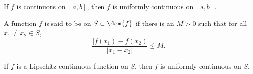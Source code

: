 \begin{theorem}
If $f$ is continuous on $[a,b]$, then $f$ is uniformly continuous on $[a,b]$. 
\end{theorem}

\begin{definition}
A function $f$ is said to be  on $S\subset \dom{f}$ if there is an $M>0$ such that for all $x_1 \neq x_2 \in S$, 
$$ \dfrac{|f(x_1)-f(x_2)}{|x_1-x_2|} \leq M.$$ 
\end{definition}

\begin{theorem}
If $f$ is a Lipschitz continuous function on $S$, then $f$ is uniformly continuous on $S$.
\end{theorem}

